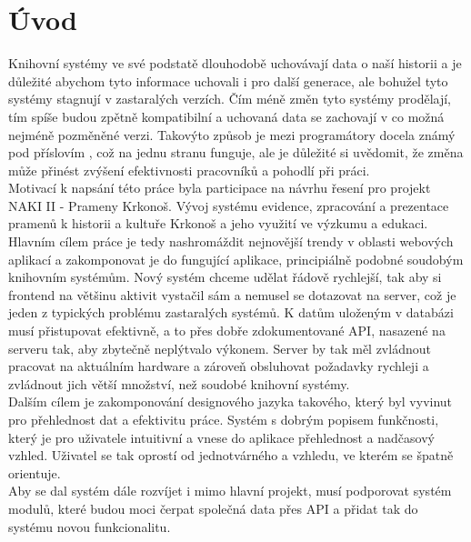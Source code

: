 \chapter{Úvod}
Knihovní systémy ve své podstatě dlouhodobě uchovávají data o naší historii a je důležité abychom
tyto informace uchovali i pro další generace, ale bohužel tyto systémy stagnují v
zastaralých verzích. Čím méně změn tyto systémy prodělají, tím spíše budou zpětně
kompatibilní a uchovaná data se zachovají v co možná nejméně pozměněné verzi.
Takovýto způsob je mezi programátory docela známý pod příslovím
, což na jednu stranu funguje, ale
je důležité si uvědomit, že změna může přinést
zvýšení efektivnosti pracovníků a pohodlí při práci.
\\

Motivací k napsání této práce byla participace na návrhu řesení
pro projekt NAKI II - Prameny Krkonoš. Vývoj systému evidence,
zpracování a prezentace pramenů k historii a kultuře Krkonoš a
jeho využití ve výzkumu a edukaci. 
\\

Hlavním cílem práce je tedy nashromáždit nejnovější trendy v oblasti webových
aplikací a zakomponovat je do fungující aplikace, principiálně podobné
soudobým knihovním systémům. Nový systém chceme udělat řádově rychlejší,
tak aby si frontend na většinu aktivit vystačil sám a nemusel se dotazovat
na server, což je jeden z typických problému zastaralých systémů.
K datům uloženým v databázi musí přistupovat efektivně, a to přes
dobře zdokumentované API, nasazené na serveru tak, aby zbytečně
neplýtvalo výkonem. Server by tak měl zvládnout pracovat na
aktuálním hardware a zároveň obsluhovat požadavky rychleji a
zvládnout jich větší množství, než soudobé knihovní systémy.
\\

Dalším cílem je zakomponování designového jazyka takového,
který byl vyvinut pro přehlednost dat a efektivitu práce.
Systém s dobrým popisem funkčnosti, který je pro uživatele 
intuitivní a vnese do aplikace přehlednost a nadčasový vzhled.
Uživatel se tak oprostí od jednotvárného a  vzhledu,
ve kterém se špatně orientuje.
\\

Aby se dal systém dále rozvíjet i mimo hlavní projekt, musí
podporovat systém modulů, které budou moci čerpat společná data přes
API a přidat tak do systému novou funkcionalitu.

